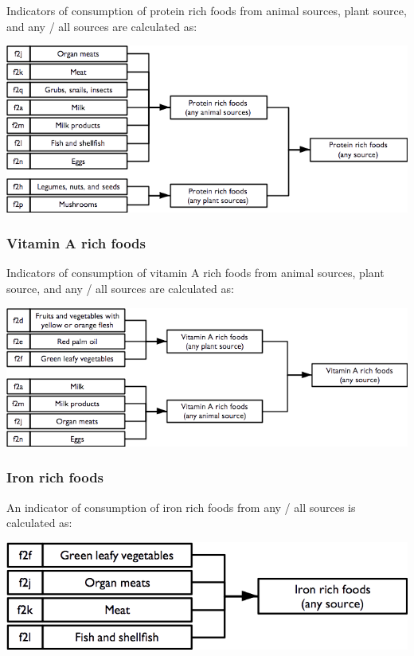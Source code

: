 \documentclass[12pt,a4paper]{book}
\theoremstyle{definition}
\theoremstyle{definition}
\theoremstyle{definition}
\theoremstyle{remark}
\begin{document}
Indicators of consumption of protein rich foods from animal sources,
plant source, and any / all sources are calculated as:

\begin{center}\includegraphics{figures/indicators09} \end{center}

\hypertarget{vitamin-a-rich-foods}{%
\subsubsection{Vitamin A rich foods}\label{vitamin-a-rich-foods}}

Indicators of consumption of vitamin A rich foods from animal sources,
plant source, and any / all sources are calculated as:

\begin{center}\includegraphics{figures/indicators10} \end{center}

\newpage

\hypertarget{iron-rich-foods}{%
\subsubsection{Iron rich foods}\label{iron-rich-foods}}

An indicator of consumption of iron rich foods from any / all sources is
calculated as:

\begin{center}\includegraphics{figures/indicators11} \end{center}
\end{document}
